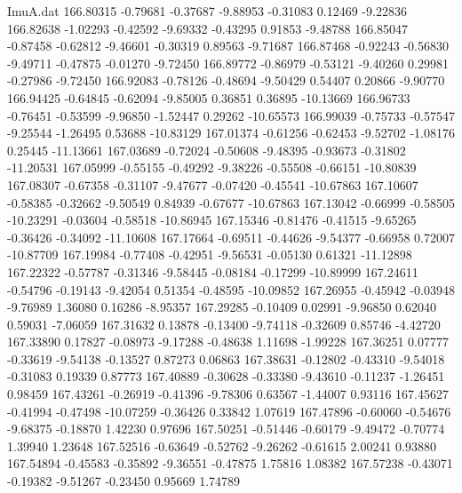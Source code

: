 \begin{filecontents}{ImuA.dat}
 166.80315   -0.79681   -0.37687   -9.88953   -0.31083    0.12469   -9.22836
 166.82638   -1.02293   -0.42592   -9.69332   -0.43295    0.91853   -9.48788
 166.85047   -0.87458   -0.62812   -9.46601   -0.30319    0.89563   -9.71687
 166.87468   -0.92243   -0.56830   -9.49711   -0.47875   -0.01270   -9.72450
 166.89772   -0.86979   -0.53121   -9.40260    0.29981   -0.27986   -9.72450
 166.92083   -0.78126   -0.48694   -9.50429    0.54407    0.20866   -9.90770
 166.94425   -0.64845   -0.62094   -9.85005    0.36851    0.36895  -10.13669
 166.96733   -0.76451   -0.53599   -9.96850   -1.52447    0.29262  -10.65573
 166.99039   -0.75733   -0.57547   -9.25544   -1.26495    0.53688  -10.83129
 167.01374   -0.61256   -0.62453   -9.52702   -1.08176    0.25445  -11.13661
 167.03689   -0.72024   -0.50608   -9.48395   -0.93673   -0.31802  -11.20531
 167.05999   -0.55155   -0.49292   -9.38226   -0.55508   -0.66151  -10.80839
 167.08307   -0.67358   -0.31107   -9.47677   -0.07420   -0.45541  -10.67863
 167.10607   -0.58385   -0.32662   -9.50549    0.84939   -0.67677  -10.67863
 167.13042   -0.66999   -0.58505  -10.23291   -0.03604   -0.58518  -10.86945
 167.15346   -0.81476   -0.41515   -9.65265   -0.36426   -0.34092  -11.10608
 167.17664   -0.69511   -0.44626   -9.54377   -0.66958    0.72007  -10.87709
 167.19984   -0.77408   -0.42951   -9.56531   -0.05130    0.61321  -11.12898
 167.22322   -0.57787   -0.31346   -9.58445   -0.08184   -0.17299  -10.89999
 167.24611   -0.54796   -0.19143   -9.42054    0.51354   -0.48595  -10.09852
 167.26955   -0.45942   -0.03948   -9.76989    1.36080    0.16286   -8.95357
 167.29285   -0.10409    0.02991   -9.96850    0.62040    0.59031   -7.06059
 167.31632    0.13878   -0.13400   -9.74118   -0.32609    0.85746   -4.42720
 167.33890    0.17827   -0.08973   -9.17288   -0.48638    1.11698   -1.99228
 167.36251    0.07777   -0.33619   -9.54138   -0.13527    0.87273    0.06863
 167.38631   -0.12802   -0.43310   -9.54018   -0.31083    0.19339    0.87773
 167.40889   -0.30628   -0.33380   -9.43610   -0.11237   -1.26451    0.98459
 167.43261   -0.26919   -0.41396   -9.78306    0.63567   -1.44007    0.93116
 167.45627   -0.41994   -0.47498  -10.07259   -0.36426    0.33842    1.07619
 167.47896   -0.60060   -0.54676   -9.68375   -0.18870    1.42230    0.97696
 167.50251   -0.51446   -0.60179   -9.49472   -0.70774    1.39940    1.23648
 167.52516   -0.63649   -0.52762   -9.26262   -0.61615    2.00241    0.93880
 167.54894   -0.45583   -0.35892   -9.36551   -0.47875    1.75816    1.08382
 167.57238   -0.43071   -0.19382   -9.51267   -0.23450    0.95669    1.74789

\end{filecontents}

